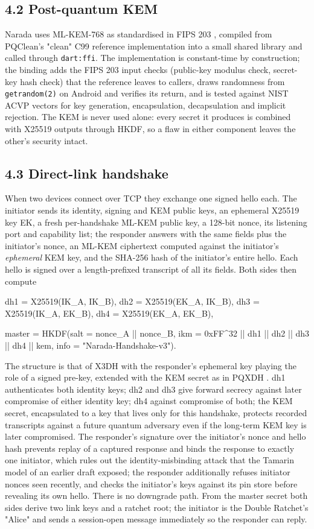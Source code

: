 \documentclass[conference]{IEEEtran}
\begin{document}
\subsection{4.2 Post-quantum KEM}
Narada uses ML-KEM-768 as standardised in FIPS 203 \cite{ref5}, compiled from PQClean's "clean" C99 reference implementation \cite{ref24} into a small shared library and called through \texttt{dart:ffi}. The implementation is constant-time by construction; the binding adds the FIPS 203 input checks (public-key modulus check, secret-key hash check) that the reference leaves to callers, draws randomness from \texttt{getrandom(2)} on Android and verifies its return, and is tested against NIST ACVP vectors for key generation, encapsulation, decapsulation and implicit rejection. The KEM is never used alone: every secret it produces is combined with X25519 outputs through HKDF, so a flaw in either component leaves the other's security intact.

\subsection{4.3 Direct-link handshake}
When two devices connect over TCP they exchange one signed hello each. The initiator sends its identity, signing and KEM public keys, an ephemeral X25519 key EK, a fresh per-handshake ML-KEM public key, a 128-bit nonce, its listening port and capability list; the responder answers with the same fields plus the initiator's nonce, an ML-KEM ciphertext computed against the initiator's \emph{ephemeral} KEM key, and the SHA-256 hash of the initiator's entire hello. Each hello is signed over a length-prefixed transcript of all its fields. Both sides then compute

dh1 = X25519(IK\_A, IK\_B), dh2 = X25519(EK\_A, IK\_B), dh3 = X25519(IK\_A, EK\_B), dh4 = X25519(EK\_A, EK\_B),

master = HKDF(salt = nonce\_A || nonce\_B, ikm = 0xFF\textasciicircum{}32 || dh1 || dh2 || dh3 || dh4 || kem, info = "Narada-Handshake-v3").

The structure is that of X3DH \cite{ref1} with the responder's ephemeral key playing the role of a signed pre-key, extended with the KEM secret as in PQXDH \cite{ref4}. dh1 authenticates both identity keys; dh2 and dh3 give forward secrecy against later compromise of either identity key; dh4 against compromise of both; the KEM secret, encapsulated to a key that lives only for this handshake, protects recorded transcripts against a future quantum adversary even if the long-term KEM key is later compromised. The responder's signature over the initiator's nonce and hello hash prevents replay of a captured response and binds the response to exactly one initiator, which rules out the identity-misbinding attack that the Tamarin model of an earlier draft exposed; the responder additionally refuses initiator nonces seen recently, and checks the initiator's keys against its pin store before revealing its own hello. There is no downgrade path. From the master secret both sides derive two link keys and a ratchet root; the initiator is the Double Ratchet's "Alice" and sends a session-open message immediately so the responder can reply.
\end{document}
